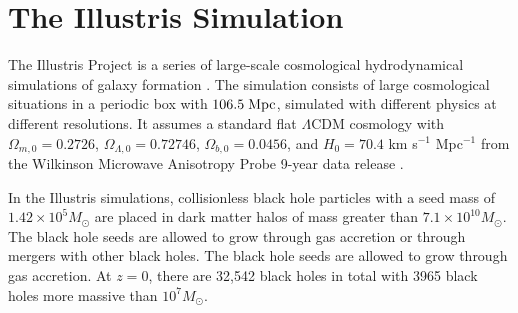 \section{The Illustris Simulation}

\label{sec:illustris}The Illustris Project is a series of large-scale
cosmological hydrodynamical simulations of galaxy formation \citep{vogelsberger2014properties}.
The simulation consists of large cosmological situations in a periodic
box with $106.5\;{\rm Mpc}$, simulated with different physics at
different resolutions. It assumes a standard flat $\Lambda$CDM cosmology
with $\Omega_{m,0}=0.2726$, $\Omega_{\Lambda,0}=0.72746$, $\Omega_{b,0}=0.0456$,
and $H_{0}=70.4$ km s$^{-1}$ Mpc$^{-1}$ from the Wilkinson Microwave
Anisotropy Probe 9-year data release \citep{hinshaw2013nineyear}.

In the Illustris simulations, collisionless black hole particles with
a seed mass of $1.42\times10^{5}M_{\odot}$ are placed in dark matter
halos of mass greater than $7.1\times10^{10}M_{\odot}$\citep{sijacki2014theillustris}.
The black hole seeds are allowed to grow through gas accretion or
through mergers with other black holes. The black hole seeds are allowed
to grow through gas accretion. At $z=0$, there are 32,542 black holes
in total with 3965 black holes more massive than $10^{7}M_{\odot}$.


